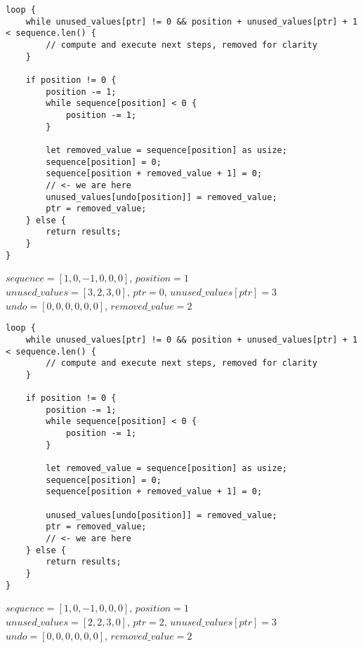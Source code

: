 \begin{frame}[fragile]
    \begin{verbatim}
loop {
    while unused_values[ptr] != 0 && position + unused_values[ptr] + 1 < sequence.len() {
        // compute and execute next steps, removed for clarity
    }
    
    if position != 0 {
        position -= 1;
        while sequence[position] < 0 {
            position -= 1;
        }
        
        let removed_value = sequence[position] as usize;
        sequence[position] = 0;
        sequence[position + removed_value + 1] = 0;
        // <- we are here
        unused_values[undo[position]] = removed_value;
        ptr = removed_value;
    } else {
        return results;
    }
}
    \end{verbatim}
    $sequence = [1, 0, -1, 0, 0, 0]$, $position = 1$\\
    $unused\_values = [3, 2, 3, 0]$, $ptr = 0$, $unused\_values[ptr] = 3$\\
    $undo = [0, 0, 0, 0, 0, 0]$, $removed\_value = 2$
\end{frame}
\begin{frame}[fragile]
    \begin{verbatim}
loop {
    while unused_values[ptr] != 0 && position + unused_values[ptr] + 1 < sequence.len() {
        // compute and execute next steps, removed for clarity
    }
    
    if position != 0 {
        position -= 1;
        while sequence[position] < 0 {
            position -= 1;
        }
        
        let removed_value = sequence[position] as usize;
        sequence[position] = 0;
        sequence[position + removed_value + 1] = 0;

        unused_values[undo[position]] = removed_value;
        ptr = removed_value;
        // <- we are here
    } else {
        return results;
    }
}
    \end{verbatim}
    $sequence = [1, 0, -1, 0, 0, 0]$, $position = 1$\\
    $unused\_values = [2, 2, 3, 0]$, $ptr = 2$, $unused\_values[ptr] = 3$\\
    $undo = [0, 0, 0, 0, 0, 0]$, $removed\_value = 2$
\end{frame}
